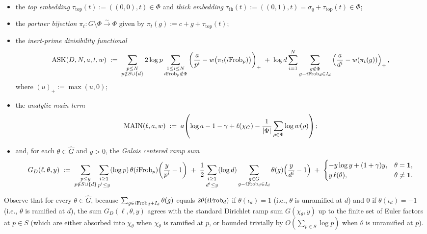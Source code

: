 \begin{itemize}
\item the \emph{top embedding} $\tau_{\mathrm{top}}(t) := ((0,0), t) \in \Phi$ and \emph{thick embedding} $\tau_{\mathrm{th}}(t) := ((0,1), t) = \sigma_q + \tau_{\mathrm{top}}(t) \in \Phi$;
\item the \emph{partner bijection} $\pi_t : G \setminus \Phi \xrightarrow{\sim} \Phi$ given by $\pi_t(g) := c + g + \tau_{\mathrm{top}}(t)$;
\item the \emph{inert-prime divisibility functional}
  \begin{equation}
  \label{eq:03:ask-def}
    \mathrm{ASK}(D, N, a, t, w) \;:=\;
    \sum_{\substack{p \le N \\ p \notin S \cup \{d\}}} 2\log p \sum_{\substack{1 \le i \le N \\ i\mathrm{Frob}_p \notin \Phi}} \left(\frac{a}{p^i} - w\bigl(\pi_t(i\mathrm{Frob}_p)\bigr)\right)_+
    \;+\; \log d \sum_{i=1}^N \sum_{\substack{g \notin \Phi \\ g - i\mathrm{Frob}_d \in I_d}} \left(\frac{a}{d^i} - w(\pi_t(g))\right)_+,
  \end{equation}
  where $(u)_+ := \max(u, 0)$;
\item the \emph{analytic main term}
  \begin{equation}
  \label{eq:03:main-def}
    \mathrm{MAIN}(\ell, a, w) \;:=\; a\!\left(\log a - 1 - \gamma + \ell(\chi_C) - \frac{1}{|\Phi|}\sum_{\rho \in \Phi} \log w(\rho)\right);
  \end{equation}
\item and, for each $\theta \in \widehat{G}$ and $y > 0$, the \emph{Galois centered ramp sum}
  \begin{equation}
  \label{eq:03:GD-def}
    G_D(\ell, \theta, y) \;:=\;
    \sum_{\substack{p \le y \\ p \notin S \cup \{d\}}} \sum_{\substack{i \ge 1 \\ p^i \le y}} (\log p)\,\theta(i\mathrm{Frob}_p)\!\left(\frac{y}{p^i} - 1\right)
    \;+\; \frac{1}{2}\sum_{\substack{i \ge 1 \\ d^i \le y}} (\log d)\sum_{\substack{g \in G \\ g - i\mathrm{Frob}_d \in I_d}} \theta(g)\!\left(\frac{y}{d^i} - 1\right)
    \;+\; \begin{cases} -y\log y + (1+\gamma)y, & \theta = \mathbf{1}, \\ y\,\ell(\theta), & \theta \neq \mathbf{1}. \end{cases}
  \end{equation}
\end{itemize}
Observe that for every $\theta \in \widehat{G}$, because $\sum_{g \in i\mathrm{Frob}_d + I_d} \theta(g)$ equals $2\theta(i\mathrm{Frob}_d)$ if $\theta(\iota_d) = 1$ (i.e., $\theta$ is unramified at $d$) and $0$ if $\theta(\iota_d) = -1$ (i.e., $\theta$ is ramified at $d$), the sum $G_D(\ell, \theta, y)$ agrees with the standard Dirichlet ramp sum $G(\chi_\theta, y)$ up to the finite set of Euler factors at $p \in S$ (which are either absorbed into $\chi_\theta$ when $\chi_\theta$ is ramified at $p$, or bounded trivially by $O(\sum_{p \in S} \log p)$ when $\theta$ is unramified at $p$).

